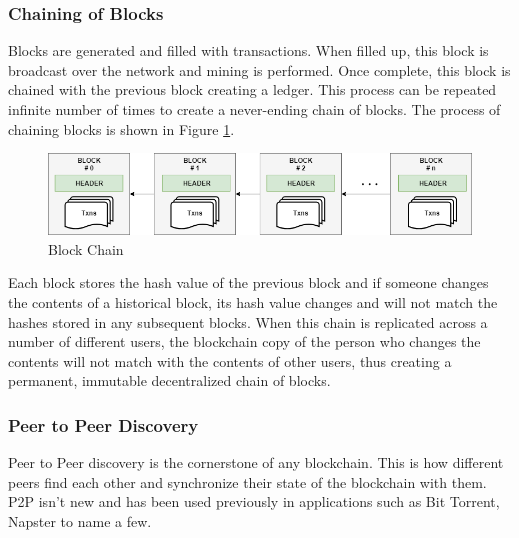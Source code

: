 \documentclass[11pt,openright]{report}
\begin{document}
\subsubsection{Chaining of Blocks}
Blocks are generated and filled with transactions. When filled up, this block is broadcast over the network and mining is performed. Once complete, this block is chained with the previous block creating a ledger. This process can be repeated infinite number of times to create a never-ending chain of blocks.
The process of chaining blocks is shown in Figure \ref{fig:Chained Blocks}.
\newline
\newline
\begin{figure}[!htbp]
    \centering
    \includegraphics[scale=0.5]{images/Blockchain.png}
    \caption{Block Chain}
    \label{fig:Chained Blocks}
\end{figure}
\newline
\newline

Each block stores the hash value of the previous block and if someone changes the contents of a historical block, its hash value changes and will not match the hashes stored in any subsequent blocks. When this chain is replicated across a number of different users, the blockchain copy of the person who changes the contents will not match with the contents of other users, thus creating a permanent, immutable decentralized chain of blocks.

\subsubsection{Peer to Peer Discovery}
Peer to Peer discovery\cite{inproceedings} is the cornerstone of any blockchain. This is how different peers find each other and synchronize their state of the blockchain with them. P2P isn't new and has been used previously in applications such as Bit Torrent, Napster to name a few.
\end{document}
